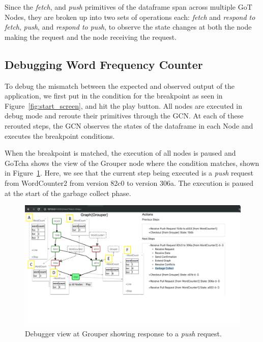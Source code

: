 Since the {\em fetch}, and {\em push}  primitives of the dataframe span across multiple GoT Nodes, they are broken up into two sets of operations each: {\em fetch} and {\em respond to fetch}, {\em push}, and {\em respond to push}, to observe the state changes at both the node making the request and the node receiving the request.

\subsection{Debugging Word Frequency Counter}
To debug the mismatch between the expected and observed output of the application, we first put in the condition for the breakpoint as seen in Figure~\ref{fig:start_screen}, and hit the play button. All nodes are executed in debug mode and reroute their primitives through the GCN. At each of these rerouted steps, the GCN observes the states of the dataframe in each Node and executes the breakpoint conditions. 

When the breakpoint is matched, the execution of all nodes is paused and GoTcha shows the view of the Grouper node where the condition matches, shown in Figure~\ref{fig:after_push_resp}. Here, we see that the current step being executed is a {\em push}  request from WordCounter2 from version 82c0 to version 306a. The execution is paused at the start of the garbage collect phase.

\begin{figure}
\centering
\includegraphics[width=\textwidth]{images/grouper_after_push_resp.png}
\caption{Debugger view at Grouper showing response to a {\em push}  request.}
\label{fig:after_push_resp}
\end{figure}

